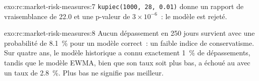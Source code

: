 \begin{solution}{exo:rc:market-risk-measures:7}
\texttt{kupiec(1000, 28, 0.01)} donne un rapport de vraisemblance de 22.0 et une p-valeur de
$3\times10^{-6}$~: le modèle est rejeté.
\end{solution}

\begin{solution}{exo:rc:market-risk-measures:8}
Aucun dépassement en 250 jours survient avec une probabilité de 8.1~\% pour un modèle correct~: un faible indice de
conservatisme. Sur quatre ans, le modèle historique a connu exactement 1~\% de dépassements, tandis que le modèle EWMA,
bien que son taux soit plus bas, a échoué au  avec un taux de 2.8~\%. Plus bas ne signifie pas meilleur.
\end{solution}

